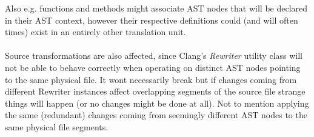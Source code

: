 Also e.g. functions and methods might associate AST nodes that will be declared in their AST context, however their respective definitions could (and will often times) exist in an entirely other translation unit.\\\\
Source transformations are also affected, since Clang's \textit{Rewriter} utility class will not be able to behave correctly when operating on distinct AST nodes pointing to the same physical file. It wont necessarily break but if changes coming from different Rewriter instances affect overlapping segments of the source file strange things will happen (or no changes might be done at all). Not to mention applying the same (redundant) changes coming from seemingly different AST nodes to the same physical file segments.\\\\
